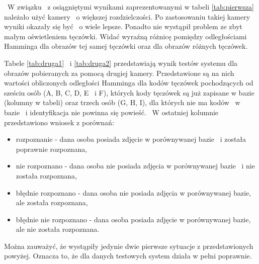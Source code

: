 ~W związku ~z osiągniętymi wynikami zaprezentowanymi w tabeli \ref{tab:pierwsza} należało użyć kamery ~o większej rozdzielczości. Po zastosowaniu takiej kamery wyniki okazały się być ~o wiele lepsze. Ponadto nie wystąpił problem ze zbyt małym oświetleniem tęczówki. Widać wyraźną różnicę pomiędzy odległościami Hamminga dla obrazów tej samej tęczówki oraz dla obrazów różnych tęczówek.

Tabele \ref{tab:druga1} ~i \ref{tab:druga2} przedstawiają wynik testów systemu dla obrazów pobieranych za pomocą drugiej kamery. Przedstawione są na nich wartości obliczonych odległości Hamminga dla kodów tęczówek pochodzących od sześciu osób (A, B, C, D, E ~i F), których kody tęczówek są już zapisane w bazie (kolumny w tabeli) oraz trzech osób (G, H, I), dla których nie ma kodów ~w bazie ~i identyfikacja nie powinna się powieść. ~W ostatniej kolumnie przedstawiono wniosek z porównań:
\begin{itemize}
\item rozpoznanie - dana osoba posiada zdjęcie w porównywanej bazie ~i została poprawnie rozpoznana,
\item nie rozpoznano - dana osoba nie posiada zdjęcia w porównywanej bazie ~i nie została rozpoznana,
\item błędnie rozpoznano - dana osoba nie posiada zdjęcia w porównywanej bazie, ale została rozpoznana,
\item błędnie nie rozpoznano - dana osoba posiada zdjęcie w porównywanej bazie, ale nie została rozpoznana.
\end{itemize}

Można zauważyć, że wystąpiły jedynie dwie pierwsze sytuacje z przedstawionych powyżej. Oznacza to, że dla danych testowych system działa w pełni poprawnie.

